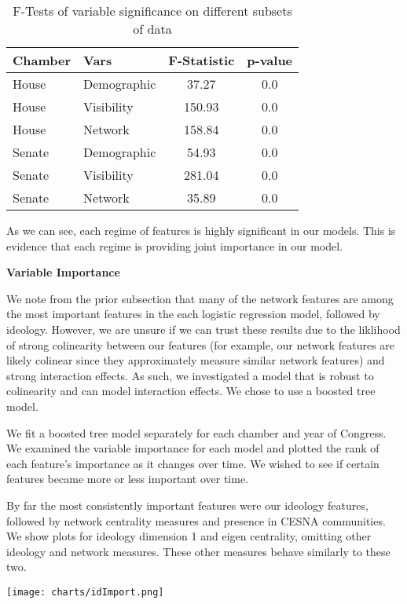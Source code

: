 \begin{table}
\centering
   \begin{tabular}{llcc}
   \toprule
   Chamber & Vars & F-Statistic & p-value \\ \midrule
   House & Demographic & 37.27 & 0.0 \\
   House & Visibility & 150.93 & 0.0 \\
   House & Network & 158.84 & 0.0 \\
   Senate & Demographic & 54.93 & 0.0 \\
   Senate & Visibility & 281.04 & 0.0 \\ 
   Senate & Network & 35.89 & 0.0 \\ \bottomrule
   \end{tabular}
   \caption{F-Tests of variable significance on different subsets of data}
   \label{table:perf}
\end{table}

As we can see, each regime of features is highly significant in our models. This
is evidence that each regime is providing joint importance in our model.

\textbf{Variable Importance}

We note from the prior subsection that many of the network features are among
the most important features in the each logistic regression model, followed by
ideology. However, we are unsure if we can trust these results due to the
liklihood of strong colinearity between our features (for example, our network
features are likely colinear since they approximately measure similar network
features) and strong interaction effects. As such, we investigated a model that
is robust to colinearity and can model interaction effects. We chose to use a
boosted tree model.

We fit a boosted tree model separately for each chamber and year of Congress. We
examined the variable importance for each model and plotted the rank of each
feature's importance as it changes over time. We wished to see if certain
features became more or less important over time.

By far the most consistently important features were our ideology features,
followed by network centrality measures and presence in CESNA communities. We
show plots for ideology dimension 1 and eigen centrality, omitting other
ideology and network measures. These other measures behave similarly to these
two.

\texttt{[image: charts/idImport.png]}

